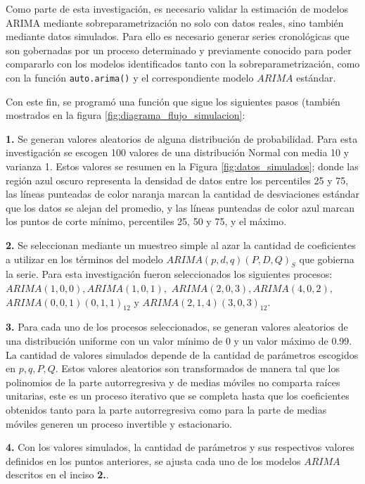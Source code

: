 \documentclass[
]{article}
\begin{document}
Como parte de esta investigación, es necesario validar la estimación de
modelos ARIMA mediante sobreparametrización no solo con datos reales,
sino también mediante datos simulados. Para ello es necesario generar
series cronológicas que son gobernadas por un proceso determinado y
previamente conocido para poder compararlo con los modelos identificados
tanto con la sobreparametrización, como con la función
\texttt{auto.arima()} y el correspondiente modelo \(ARIMA\) estándar.

Con este fin, se programó una función que sigue los siguientes pasos
(también mostrados en la figura \ref{fig:diagrama_flujo_simulacion}:

\textbf{1.} Se generan valores aleatorios de alguna distribución de
probabilidad. Para esta investigación se escogen 100 valores de una
distribución Normal con media 10 y varianza 1. Estos valores se resumen
en la Figura \ref{fig:datos_simulados}; donde las región azul oscuro
representa la densidad de datos entre los percentiles 25 y 75, las
líneas punteadas de color naranja marcan la cantidad de desviaciones
estándar que los datos se alejan del promedio, y las líneas punteadas de
color azul marcan los puntos de corte mínimo, percentiles 25, 50 y 75, y
el máximo.

\textbf{2.} Se seleccionan mediante un muestreo simple al azar la
cantidad de coeficientes a utilizar en los términos del modelo
\(ARIMA(p,d,q)(P,D,Q)_S\) que gobierna la serie. Para esta investigación
fueron seleccionados los siguientes procesos:
\(ARIMA(1,0,0), ARIMA(1,0,1),\) \(ARIMA(2,0,3), ARIMA(4,0,2),\)
\(ARIMA(0,0,1)(0,1,1)_{12}\) y \(ARIMA(2,1,4)(3,0,3)_{12}\).

\textbf{3.} Para cada uno de los procesos seleccionados, se generan
valores aleatorios de una distribución uniforme con un valor mínimo de 0
y un valor máximo de 0.99. La cantidad de valores simulados depende de
la cantidad de parámetros escogidos en \(p, q, P, Q\). Estos valores
aleatorios son transformados de manera tal que los polinomios de la
parte autorregresiva y de medias móviles no comparta raíces unitarias,
este es un proceso iterativo que se completa hasta que los coeficientes
obtenidos tanto para la parte autorregresiva como para la parte de
medias móviles generen un proceso invertible y estacionario.

\textbf{4.} Con los valores simulados, la cantidad de parámetros y sus
respectivos valores definidos en los puntos anteriores, se ajusta cada
uno de los modelos \(ARIMA\) descritos en el inciso \textbf{2.}.
\end{document}
